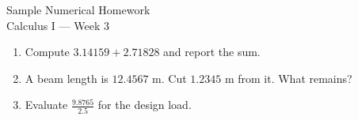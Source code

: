 \documentclass{article}
\begin{document}

\begin{center}
{\Large Sample Numerical Homework}\\[0.5em]
{\large Calculus I — Week 3}
\end{center}

\vspace{1em}

\begin{enumerate}
  \item Compute $3.14159 + 2.71828$ and report the sum.
  \item A beam length is $12.4567$ m. Cut $1.2345$ m from it. What remains?
  \item Evaluate $\frac{9.8765}{2.5}$ for the design load.
\end{enumerate}
\end{document}
